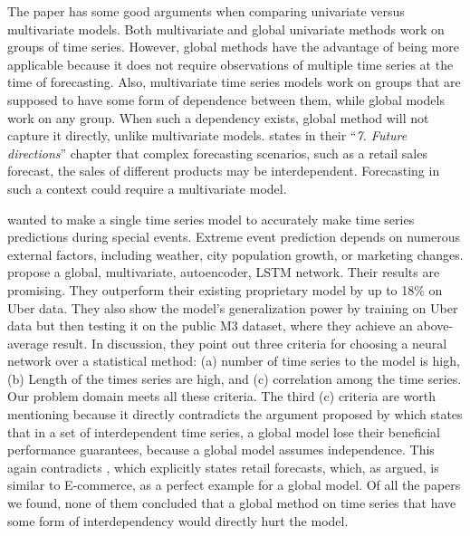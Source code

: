 The paper \cite{Rabanser2020} has some good arguments when comparing univariate versus multivariate models.
Both multivariate and global univariate methods work on groups of time series.
However, global methods
have the advantage of being more applicable because it does not require observations of multiple
time series at the time of forecasting.
Also, multivariate time series models work on groups that are supposed to have some form of
dependence between them, while global models work on any group.
When such a dependency exists, global method will not capture it directly, unlike multivariate models.
\cite{Hewamalage2021} states in their ``\textit{7. Future directions}'' chapter that complex
forecasting scenarios, such as a retail sales forecast, the sales of different products
may be interdependent.
Forecasting in such a context could require a multivariate model.

\cite{Laptev} wanted to make a single time series model to
accurately make time series predictions during special events.
Extreme event prediction depends on numerous external factors, including weather, city population growth, or marketing
changes.
\cite{Laptev} propose a global, multivariate, autoencoder, LSTM network.
Their results are promising. They outperform their existing
proprietary model by up to 18\% on Uber data.
They also show the model's generalization power by training on Uber data
but then testing it on the public M3 dataset, where they achieve an above-average result.
In \cite{Laptev} discussion, they point out three criteria for
choosing a neural network over a statistical method:
(a) number of time series to the model is high, (b) Length of the
times series are high, and (c) correlation among the time series.
Our problem domain meets all these criteria.
The third (c) criteria are worth mentioning because it directly
contradicts the argument proposed by \cite{Montero-Manso2021}%
which states that in a set of interdependent time series,
a global model lose their beneficial performance guarantees,
because a global model assumes independence.
This again contradicts \cite{Hewamalage2021}, which explicitly states
retail forecasts, which, as argued, is similar to E-commerce,
as a perfect example for a global model.
Of all the papers we found, none of them concluded that a global method
on time series that have some form of interdependency would directly hurt the model.



